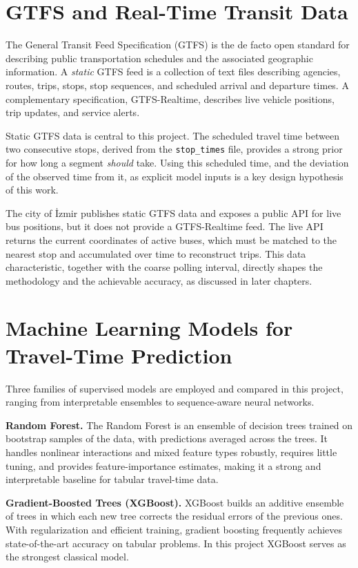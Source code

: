 \section{GTFS and Real-Time Transit Data}

The General Transit Feed Specification (GTFS) \cite{gtfs} is the de facto open standard for describing public transportation schedules and the associated geographic information. A \emph{static} GTFS feed is a collection of text files describing agencies, routes, trips, stops, stop sequences, and scheduled arrival and departure times. A complementary specification, GTFS-Realtime, describes live vehicle positions, trip updates, and service alerts.

Static GTFS data is central to this project. The scheduled travel time between two consecutive stops, derived from the \texttt{stop\_times} file, provides a strong prior for how long a segment \emph{should} take. Using this scheduled time, and the deviation of the observed time from it, as explicit model inputs is a key design hypothesis of this work.

The city of İzmir publishes static GTFS data and exposes a public API for live bus positions, but it does not provide a GTFS-Realtime feed. The live API returns the current coordinates of active buses, which must be matched to the nearest stop and accumulated over time to reconstruct trips. This data characteristic, together with the coarse polling interval, directly shapes the methodology and the achievable accuracy, as discussed in later chapters.

\section{Machine Learning Models for Travel-Time Prediction}

Three families of supervised models are employed and compared in this project, ranging from interpretable ensembles to sequence-aware neural networks.

\textbf{Random Forest.} The Random Forest \cite{breiman2001} is an ensemble of decision trees trained on bootstrap samples of the data, with predictions averaged across the trees. It handles nonlinear interactions and mixed feature types robustly, requires little tuning, and provides feature-importance estimates, making it a strong and interpretable baseline for tabular travel-time data.

\textbf{Gradient-Boosted Trees (XGBoost).} XGBoost \cite{chen2016} builds an additive ensemble of trees in which each new tree corrects the residual errors of the previous ones. With regularization and efficient training, gradient boosting frequently achieves state-of-the-art accuracy on tabular problems. In this project XGBoost serves as the strongest classical model.

